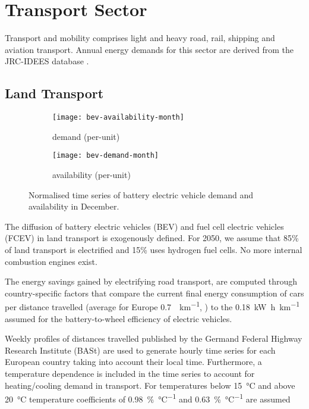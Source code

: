\section{Transport Sector}
\label{sec:si:transport}

Transport and mobility comprises light and heavy road, rail, shipping and
aviation transport. Annual energy demands for this sector are derived from the
JRC-IDEES database .

\subsection{Land Transport}
\label{sec:si:transport:land}

\begin{figure}
    \centering
    \begin{subfigure}[t]{\textwidth}
        \centering
        \caption{demand (per-unit)}
        \texttt{[image: bev-availability-month]}
    \end{subfigure}
    \vspace{-0.5cm}
    \begin{subfigure}[t]{\textwidth}
        \centering
        \caption{availability (per-unit)}
        \texttt{[image: bev-demand-month]}
    \end{subfigure}
    \caption{Normalised time series of battery electric vehicle demand and availability in December.}
    \label{fig:bev-demand-availability}
\end{figure}

The diffusion of battery electric vehicles (BEV) and fuel cell electric vehicles
(FCEV) in land transport is exogenously defined. For 2050, we assume that 85\%
of land transport is electrified and 15\% uses hydrogen fuel cells. No more
internal combustion engines exist.

The energy savings gained by electrifying road transport, are computed through
country-specific factors that compare the current final energy consumption of
cars per distance travelled (average for Europe
\SI{0.7}{\kwh\per\kilo\metre}, ) to the
\SI{0.18}{\kilo\watt\hour\per\kilo\metre} assumed for the battery-to-wheel
efficiency of electric vehicles.

Weekly profiles of distances travelled published by the Germand Federal Highway
Research Institute (BASt)  are used to generate hourly time series for
each European country taking into account their local time. Furthermore, a
temperature dependence is included in the time series to account for
heating/cooling demand in transport. For temperatures below \SI{15}{\celsius}
and above \SI{20}{\celsius} temperature coefficients of
\SI{0.98}{\percent\per\celsius} and \SI{0.63}{\percent\per\celsius} are assumed

